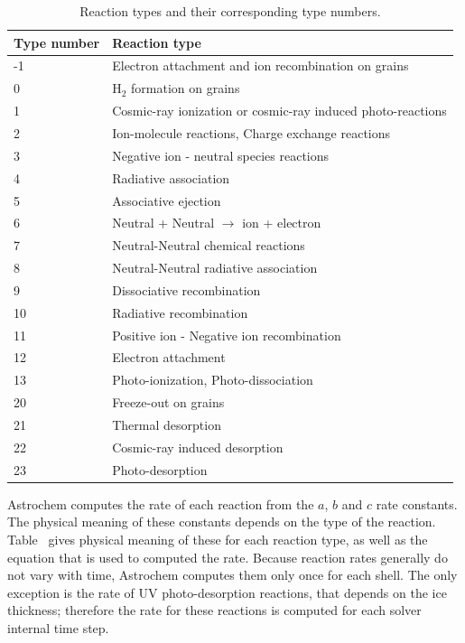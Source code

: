 \documentclass[a4paper,12pt]{article}
\begin{document}
\begin{table}
  \begin{center}
    \caption{Reaction types and their corresponding type numbers.}
    \begin{tabular}{ll}
      \hline
      \hline
      Type number & Reaction type\\
      \hline
      -1 & Electron attachment and ion recombination on grains\\
      0  & H$_{2}$ formation on grains\\
      1  & Cosmic-ray ionization or cosmic-ray induced photo-reactions\\
      2  & Ion-molecule reactions, Charge exchange reactions\\
      3  & Negative ion - neutral species reactions\\
      4  & Radiative association\\
      5  & Associative ejection\\
      6  & Neutral + Neutral $\rightarrow$ ion + electron\\
      7  & Neutral-Neutral chemical reactions\\
      8  & Neutral-Neutral radiative association\\
      9  & Dissociative recombination\\
      10 & Radiative recombination\\
      11 & Positive ion - Negative ion recombination\\
      12 & Electron attachment\\
      13 & Photo-ionization, Photo-dissociation\\
      20 & Freeze-out on grains\\
      21 & Thermal desorption\\
      22 & Cosmic-ray induced desorption\\
      23 & Photo-desorption\\
      \hline
    \end{tabular}
    \label{tab:react-type-numb}
  \end{center}
\end{table}

Astrochem computes the rate of each reaction from the $a$, $b$ and $c$
rate constants. The physical meaning of these constants depends on the
type of the reaction. Table~\label{tab:rate-const-meaning} gives
physical meaning of these for each reaction type, as well as the
equation that is used to computed the rate. Because reaction rates
generally do not vary with time, Astrochem computes them only once for
each shell. The only exception is the rate of UV photo-desorption
reactions, that depends on the ice thickness; therefore the rate for
these reactions is computed for each solver internal time step.
\end{document}
